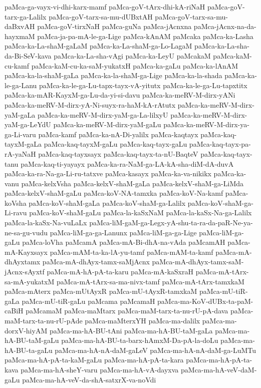 {paMca-ga-vayx-vi-dhi-karx-mamf
paMca-goV-tArx-dhi-kA-riNaH
paMca-goV-tarx-ga-Lalilx
paMca-goV-tarx-sa-mu-dUBxtAH
paMca-goV-tarx-sa-mu-daBxvAH
paMca-goV-tirxNaH
paMca-guNa
paMca-jAcnxna
paMca-jAcnx-na-da-hayxmaM
paMca-ja-pa-mA-le-ga-Lige
paMca-kAnAM
paMcaka
paMca-ka-Lasha
paMca-ka-La-shaM-gaLaM
paMca-ka-La-shaM-ga-Lo-LagaM
paMca-ka-La-sha-da-Bi-SeV-kava
paMca-ka-La-sha-vAgi
paMca-ka-LeyU
paMcakaM
paMca-kaM-cu-kamf
paMca-kaM-cu-ka-saM-yukatxH
paMca-ka-gaLu
paMca-ka-lAnAM
paMca-ka-la-shaM-gaLa
paMca-ka-la-shaM-ga-Lige
paMca-ka-la-shada
paMca-ka-le-ga-Lanu
paMca-ka-le-ga-Lu-tapx-tayx-vA-yitutx
paMca-ka-le-ga-Lu-tapxtitx
paMca-ka-mAR-KayxM-ga-Lu-da-yi-si-davu
paMca-ka-meRV-M-dirx-yANi
paMca-ka-meRV-M-dirx-yA-Ni-suyx-ra-haM-kA-rAtutx
paMca-ka-meRV-M-dirx-yaM-gaLa
paMca-ka-meRV-M-dirx-yaM-ga-La-lilxyU
paMca-ka-meRV-M-dirx-yaM-ga-LeYdU
paMca-ka-meRV-M-dirx-yaM-gaLu
paMca-ka-meRV-M-dirx-ya-ga-Li-varu
paMca-kamf
paMca-ka-nA-Di-yalilx
paMca-kaqtayx
paMca-kaq-tayxM-gaLa
paMca-kaq-tayxM-gaLu
paMca-kaq-tayx-gaLu
paMca-kaq-tayx-pa-rA-yaNaH
paMca-kaq-tayxsayx
paMca-kaq-tayx-ta-nU-BaqteV
paMca-kaq-tayx-tanu
paMca-kaq-ti-yayayx
paMca-ka-ra-NaM-ga-LA-kA-sha-diM-dA-duvA
paMca-ka-ra-Na-ga-Li-ru-tatxve
paMca-kasayx
paMca-ka-va-nikikx
paMca-ka-vanu
paMca-kelxVsha
paMca-kelxV-shaM-gaLa
paMca-kelxV-shaM-ga-LiMda
paMca-kelxV-shaM-gaLu
paMca-koV-NA-tamxka
paMca-koV-Na-kamf
paMca-koVsha
paMca-koV-shaM-gaLa
paMca-koV-shaM-ga-Lalilx
paMca-koV-shaM-ga-Li-ravu
paMca-koV-shaM-gaLu
paMca-la-kaSxNaM
paMca-la-kaSx-Na-ga-Lalilx
paMca-la-kaSx-Na-vuLaLx
paMca-liM-gaM-ga-Legx-yA-shu-ta-ra-da-paR-Ne-ya-ne-sa-gu-vudu
paMca-liM-ga-ga-Lanunx
paMca-liM-ga-ga-Lige
paMca-liM-ga-gaLu
paMca-loVha
paMcamA
paMca-mA-Bi-dhA-na-vAda
paMcamAH
paMca-mA-Kayxsayx
paMca-mAM-ta-ka-lA-yu-tamf
paMca-mAM-ta-kamf
paMca-mA-dhAyxtamx
paMca-mA-dhAyx-tamx-saMjAcnx
paMca-mA-dhAyx-tamx-saM-jAcnx-sAyxtf
paMca-mA-hA-pA-ta-karu
paMca-mA-kaSxraH
paMca-mA-tArx-sa-mA-yukatxM
paMca-mA-tArx-sa-ma-nivx-tamf
paMca-mA-tArx-tamxkaM
paMca-mAterx
paMca-mUtAyxR
paMca-mU-tAyxR-tamxkaM
paMca-mU-tiR-gaLa
paMca-mU-tiR-gaLu
paMcama
paMcamaH
paMca-ma-KoV-dUBx-ta-paM-caBiH
paMcamaM
paMca-maMtarx
paMca-maM-tarx-ta-nu-rU-pA-dava
paMca-maM-tarx-ta-nu-rU-pAde
paMca-maMterxYH
paMca-ma-dalilx
paMca-ma-dorxV-hiyAM
paMca-ma-hA-BU-tAni
paMca-ma-hA-BU-taM-gaLa
paMca-ma-hA-BU-taM-gaLu
paMca-ma-hA-BU-ta-barx-hAmxM-Da-pA-la-doLu
paMca-ma-hA-BU-ta-gaLu
paMca-ma-hA-nA-daM-gaLeV
paMca-ma-hA-nA-daM-ga-LuMTu
paMca-ma-hA-pA-ta-kaM-gaLu
paMca-ma-hA-pA-ta-kara
paMca-ma-hA-pA-ta-kava
paMca-ma-hA-sheY-varu
paMca-ma-hA-vA-dayxva
paMca-ma-hA-veV-daM-gaLu
paMca-ma-hA-veV-da-shA-satxrX-va-noVdi
}
